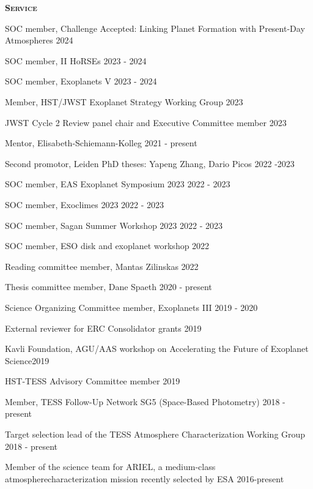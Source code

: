 \documentclass[12pt,letterpaper]{article}
\begin{document}
\textbf{\textsc{Service}} 
\begin{compactitem}[]
\item {SOC member, Challenge Accepted: Linking Planet Formation with Present-Day Atmospheres \hfill 2024}
\item {SOC member, II HoRSEs \hfill 2023 - 2024}
\item {SOC member, Exoplanets V \hfill 2023 - 2024}
\item {Member, HST/JWST Exoplanet Strategy Working Group \hfill 2023}
\item {JWST Cycle 2 Review panel chair and Executive Committee member \hfill 2023}
\item{Mentor, Elisabeth-Schiemann-Kolleg \hfill 2021 - present}
\item {Second promotor, Leiden PhD theses: Yapeng Zhang, Dario Picos \hfill 2022 -2023}
\item {SOC member, EAS Exoplanet Symposium 2023 \hfill 2022 - 2023}
\item {SOC member, Exoclimes 2023 \hfill 2022 - 2023}
\item {SOC member, Sagan Summer Workshop 2023 \hfill 2022 - 2023}
\item {SOC member, ESO disk and exoplanet workshop \hfill 2022}
\item {Reading committee member, Mantas Zilinskas \hfill 2022}
\item {Thesis committee member, Dane Spaeth \hfill 2020 -  present}
\item {Science Organizing Committee member, Exoplanets III \hfill 2019 - 2020}
\item {External reviewer for ERC Consolidator grants \hfill 2019}
\item {Kavli Foundation, AGU/AAS workshop on Accelerating the Future of Exoplanet Science\hfill 2019}
\item {HST-TESS Advisory Committee member \hfill 2019}
\item {Member, TESS Follow-Up Network SG5 (Space-Based Photometry) \hfill 2018 - present}
\item {Target selection lead of the TESS Atmosphere Characterization Working Group \hfill 2018 - present}	
\item {Member of the science team for ARIEL, a medium-class atmosphere\newline characterization mission recently selected by ESA \hfill 2016-present}

\end{compactitem}
\end{document}
